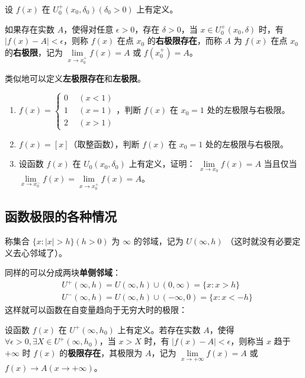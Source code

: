   设 $f(x)$ 在 $U^+_0(x_0,\delta_0)(\delta_0>0)$ 上有定义。

  如果存在实数 $A$，使得对任意 $\epsilon >0$，存在 $\delta>0$，当 $x\in U_0^+(x_0,\delta)$ 时，有 $|f(x)-A|<\epsilon$，则称 $f(x)$ 在点 $x_0$ 的\textbf{右极限存在}，而称 $A$ 为 $f(x)$ 在点 $x_0$ 的\textbf{右极限}，记为 $\lim\limits_{x\rightarrow x_0^+}f(x)=A$ 或 $f(x_0^+)=A$。

  类似地可以定义\textbf{左极限存在}和\textbf{左极限}。

\begin{exercise}{}
\begin{enumerate}
\item $f(x)=\left\{\begin{aligned} 0\ \ &(x<1)\\ 1\ \ &(x= 1)\\2\ \ &(x>1) \end{aligned}\right.$，判断 $f(x)$ 在 $x_0=1$ 处的左极限与右极限。
\item  $f(x)=[x]$（取整函数），判断 $f(x)$ 在 $x_0=1$ 处的左极限与右极限。
\item  设函数 $f(x)$ 在 $U_0(x_0,\delta_0)$ 上有定义，证明： $\lim\limits_{x\rightarrow x_0} f(x)=A$ 当且仅当 $\lim\limits_{x\rightarrow x_0^-}f(x)=\lim\limits_{x\rightarrow x_0^+}f(x)=A$。
\end{enumerate}
\end{exercise}

\subsection{函数极限的各种情况}
称集合 $\{x:|x|>h\}(h>0)$ 为 $\infty$ 的邻域，记为 $U(\infty,h)$ （这时就没有必要定义去心邻域了）。

同样的可以分成两块\textbf{单侧邻域}：
\begin{equation}
\begin{aligned}
&U^+(\infty,h)=U(\infty,h)\cup (0,\infty)=\{x:x>h\}\\
&U^-(\infty,h)=U(\infty,h)\cup (-\infty,0)=\{x:x<-h\}
\end{aligned}
\end{equation}
  这样就可以函数在自变量趋向于无穷大时的极限：

  设函数 $f(x)$ 在 $U^+(\infty,h_0)$ 上有定义。若存在实数 $A$，使得 $\forall \epsilon >0, \exists X\in U^+(\infty,h_0)$，当 $x>X$ 时，有 $|f(x)-A|<\epsilon$，则称当 $x$ 趋于 $+\infty$ 时 $f(x)$ 的\textbf{极限存在}，其极限为 $A$，记为 $\lim\limits_{x\rightarrow +\infty}f(x)=A$ 或 $f(x)\rightarrow A(x\rightarrow +\infty)$。

